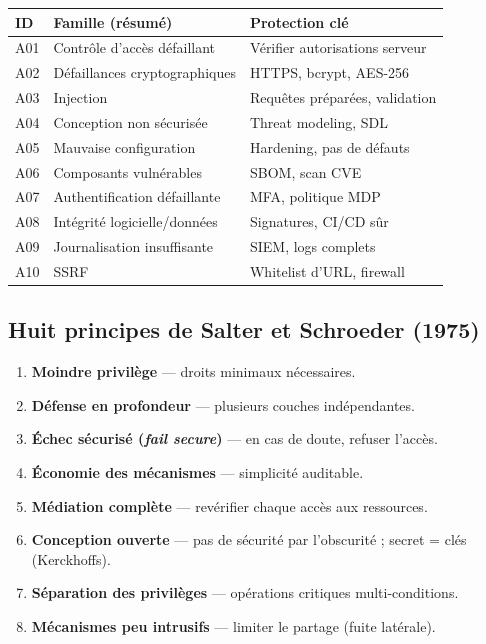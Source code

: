 \documentclass[11pt,a4paper]{article}
\begin{document}
\begin{center}
\small
\begin{tabular}{@{}lll@{}}
\toprule
\textbf{ID} & \textbf{Famille (résumé)} & \textbf{Protection clé} \\
\midrule
A01 & Contrôle d'accès défaillant & Vérifier autorisations serveur \\
A02 & Défaillances cryptographiques & HTTPS, bcrypt, AES-256 \\
A03 & Injection & Requêtes préparées, validation \\
A04 & Conception non sécurisée & Threat modeling, SDL \\
A05 & Mauvaise configuration & Hardening, pas de défauts \\
A06 & Composants vulnérables & SBOM, scan CVE \\
A07 & Authentification défaillante & MFA, politique MDP \\
A08 & Intégrité logicielle/données & Signatures, CI/CD sûr \\
A09 & Journalisation insuffisante & SIEM, logs complets \\
A10 & SSRF & Whitelist d'URL, firewall \\
\bottomrule
\end{tabular}
\end{center}

\subsection{Huit principes de Salter et Schroeder (1975)}
\begin{enumerate}[nosep]
  \item \textbf{Moindre privilège} — droits minimaux nécessaires.
  \item \textbf{Défense en profondeur} — plusieurs couches indépendantes.
  \item \textbf{Échec sécurisé (\emph{fail secure})} — en cas de doute, refuser l'accès.
  \item \textbf{Économie des mécanismes} — simplicité auditable.
  \item \textbf{Médiation complète} — revérifier chaque accès aux ressources.
  \item \textbf{Conception ouverte} — pas de sécurité par l'obscurité ; secret = clés (Kerckhoffs).
  \item \textbf{Séparation des privilèges} — opérations critiques multi-conditions.
  \item \textbf{Mécanismes peu intrusifs} — limiter le partage (fuite latérale).
\end{enumerate}
\end{document}

